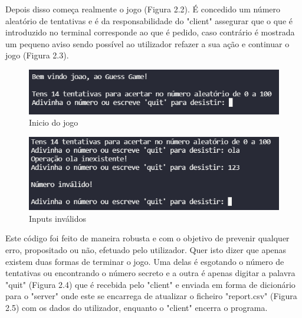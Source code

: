 \documentclass{report}
\begin{document}
\pagebreak

Depois disso começa realmente o jogo (Figura 2.2). É concedido um número aleatório de tentativas e é da responsabilidade do "client" assegurar que o que é introduzido no terminal corresponde ao que é pedido, caso contrário é mostrada um pequeno aviso sendo possível ao utilizador refazer a sua ação e continuar o jogo (Figura 2.3).

\vspace{10mm}
    \begin{figure}[h]
        \begin{center}
            \includegraphics[scale=0.5]{unknown.png}
            \caption{Inicio do jogo}
        \end{center}
    \end{figure}
    
\vspace{10mm}
    \begin{figure}[h]
        \begin{center}
            \includegraphics[scale=0.5]{unknown (1).png}
            \caption{Inputs inválidos}
        \end{center}
    \end{figure}
\pagebreak

Este código foi feito de maneira robusta e com o objetivo de prevenir qualquer erro, propositado ou não, efetuado pelo utilizador. Quer isto dizer que apenas existem duas formas de terminar o jogo. Uma delas é esgotando o número de tentativas ou encontrando o número secreto e a outra é apenas digitar a palavra "quit" (Figura 2.4) que é recebida pelo "client" e enviada em forma de dicionário para o "server" onde este se encarrega de atualizar o ficheiro "report.csv" (Figura 2.5) com os dados do utilizador, enquanto o "client" encerra o programa.
\end{document}
